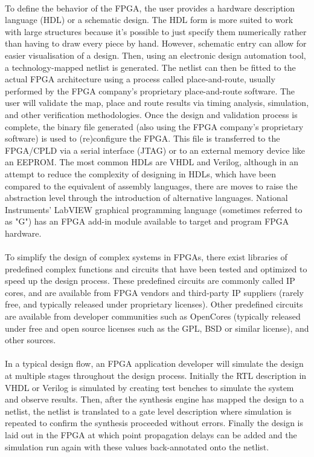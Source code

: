 \documentclass[14pt]{report}
\begin{document}
{\paragraph{} To define the behavior of the FPGA, the user provides a hardware description language (HDL) or a schematic design. The HDL form is more suited to work with large structures because it's possible to just specify them numerically rather than having to draw every piece by hand. However, schematic entry can allow for easier visualisation of a design. Then, using an electronic design automation tool, a technology-mapped netlist is generated. The netlist can then be fitted to the actual FPGA architecture using a process called place-and-route, usually performed by the FPGA company's proprietary place-and-route software. The user will validate the map, place and route results via timing analysis, simulation, and other verification methodologies. Once the design and validation process is complete, the binary file generated (also using the FPGA company's proprietary software) is used to (re)configure the FPGA. This file is transferred to the FPGA/CPLD via a serial interface (JTAG) or to an external memory device like an EEPROM.  The most common HDLs are VHDL and Verilog, although in an attempt to reduce the complexity of designing in HDLs, which have been compared to the equivalent of assembly languages, there are moves to raise the abstraction level through the introduction of alternative languages. National Instruments' LabVIEW graphical programming language (sometimes referred to as "G") has an FPGA add-in module available to target and program FPGA hardware.
\paragraph{} To simplify the design of complex systems in FPGAs, there exist libraries of predefined complex functions and circuits that have been tested and optimized to speed up the design process. These predefined circuits are commonly called IP cores, and are available from FPGA vendors and third-party IP suppliers (rarely free, and typically released under proprietary licenses). Other predefined circuits are available from developer communities such as OpenCores (typically released under free and open source licenses such as the GPL, BSD or similar license), and other sources.
\paragraph{} In a typical design flow, an FPGA application developer will simulate the design at multiple stages throughout the design process. Initially the RTL description in VHDL or Verilog is simulated by creating test benches to simulate the system and observe results. Then, after the synthesis engine has mapped the design to a netlist, the netlist is translated to a gate level description where simulation is repeated to confirm the synthesis proceeded without errors. Finally the design is laid out in the FPGA at which point propagation delays can be added and the simulation run again with these values back-annotated onto the netlist.
}
\end{document}
